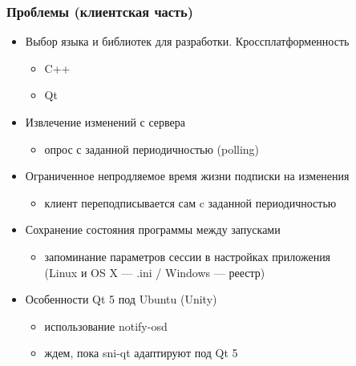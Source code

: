 \documentclass[10pt,pdf,hyperref={unicode}]{beamer}
\begin{document}
    \begin{frame}\frametitle{Проблемы (клиентская часть)}
        \begin{itemize}%
            \item Выбор языка и библиотек для разработки. Кроссплатформенность
            \pause
            \begin{itemize}
                \item C++
                \item Qt
            \end{itemize}
            \pause
            \item Извлечение изменений с сервера
            \pause
            \begin{itemize}
                \item опрос с заданной периодичностью (polling)
            \end{itemize}
            \pause
            \item Ограниченное непродляемое время жизни подписки на изменения
            \pause
            \begin{itemize}
                \item клиент переподписывается сам c заданной периодичностью
            \end{itemize}
            \pause
            \item Сохранение состояния программы между запусками
            \pause
            \begin{itemize}
                \item запоминание параметров сессии в настройках приложения \\
                (Linux и OS X --- .ini / Windows --- реестр)
            \end{itemize}
            \pause
            \item Особенности Qt 5 под Ubuntu (Unity)
            \begin{itemize}
                \item использование notify-osd
                \item ждем, пока sni-qt адаптируют под Qt 5
            \end{itemize}
        \end{itemize}
    \end{frame}
    
\end{document}
